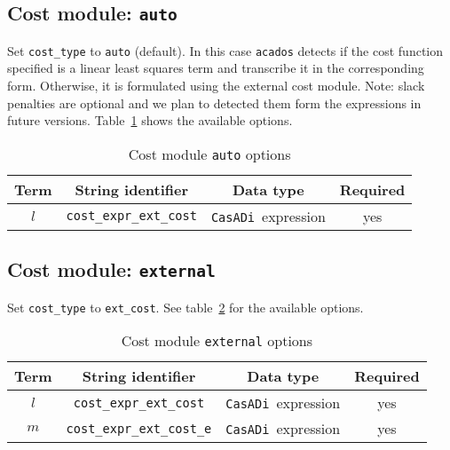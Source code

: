 \documentclass[english]{article}
\newcommand{\code}[1]{\texttt{#1}}
\newcommand{\casadi}{\texttt{CasADi}}
\newcommand{\acados}{\texttt{acados}}
\newcommand{\mandatory}{yes}
\begin{document}
\subsection{Cost module: \code{auto}}\label{sec:cost:auto}
%
Set \code{cost\_type} to \code{auto} (default).
In this case \acados{} detects if the cost function specified is a linear least squares term and transcribe it in the corresponding form.
Otherwise, it is formulated using the external cost module.
Note: slack penalties are optional and we plan to detected them form the expressions in future versions.
Table~\ref{tab:cost:auto} shows the available options.
%
\begin{table}[h!]
    \centering
    \caption{Cost module \code{auto} options} \label{tab:cost:auto}
    \begin{tabular}{cccc}
        \toprule
        Term & String identifier & Data type & Required \\ \midrule
        $ l $ & \code{cost\_expr\_ext\_cost}    & \casadi~expression   & \mandatory  \\ 
        \bottomrule
    \end{tabular}
\end{table}
%
\subsection{Cost module: \code{external}}\label{sec:cost:external}
%
Set \code{cost\_type} to \code{ext\_cost}. %
See table~\ref{tab:cost:external} for the available options.
\begin{table}[h!]
    \centering
    \caption{Cost module \code{external} options} \label{tab:cost:external}
    \begin{tabular}{cccc}
        \toprule
        Term & String identifier & Data type & Required \\ \midrule
        $ l $ & \code{cost\_expr\_ext\_cost}    & \casadi~expression   & \mandatory  \\
        $ m $ & \code{cost\_expr\_ext\_cost\_e}    & \casadi~expression  & \mandatory \\
        \bottomrule
    \end{tabular}
\end{table}
%
\end{document}

